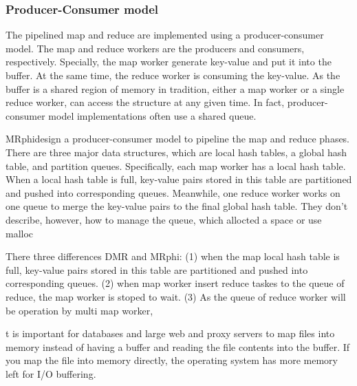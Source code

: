 

\subsubsection{Producer-Consumer model}
The pipelined map and reduce are implemented using a
producer-consumer model. 
The map and reduce workers are the producers and consumers, respectively.
Specially, the map worker generate key-value and 
put it into the buffer.
At the same time, 
the reduce worker is consuming the key-value.
As the buffer is a shared region of memory in tradition,
either a map worker or a single reduce worker,
can access the structure at any given time.
In fact, producer-consumer model implementations
often use a shared queue.

MRphi\cite{lu2013mrphi}design a producer-consumer model 
to pipeline the map and reduce phases. 
There are three major data structures, 
which are local hash tables, a global hash table, 
and partition queues. 
Specifically, each map worker has a local hash table. 
When a local hash table is full,
key-value pairs stored in this table are partitioned and
pushed into corresponding queues. 
Meanwhile, one reduce
worker works on one queue to merge the key-value pairs to
the final global hash table.
{\color{red}They don’t describe, however, how to manage the queue,
which allocted a space or use malloc}


There three differences DMR and MRphi:
(1) when the map local hash table is full,
key-value pairs stored in this table are partitioned and
pushed into corresponding queues.
(2) when map worker insert reduce taskes to the queue of reduce,
the map worker is stoped to wait.
(3)%
As the queue of reduce worker will be operation by multi map worker,

t is important for databases and large web and proxy servers to map files into memory instead of having a buffer and reading the file contents into the buffer. If you map the file into memory directly, the operating system has more memory left for I/O buffering.

